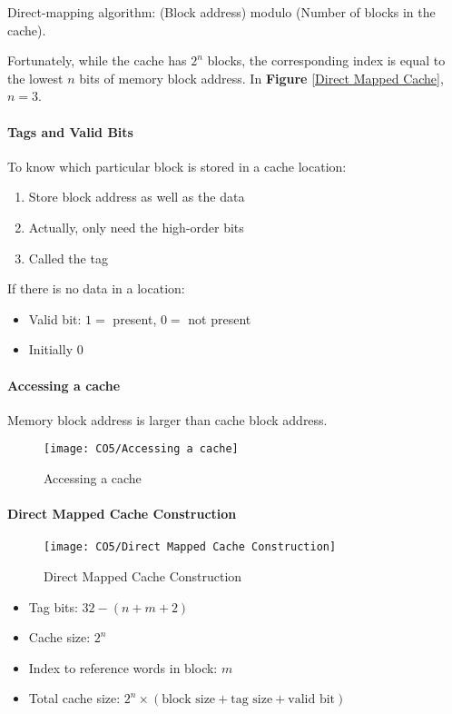 Direct-mapping algorithm: (Block address) modulo (Number of blocks in the cache). 

Fortunately, while the cache has $2^n$ blocks, the corresponding index is equal to the lowest $n$ bits of memory block address. In \textbf{Figure} \ref{Direct Mapped Cache}, $n=3$.

\paragraph{Tags and Valid Bits}
To know which particular block is stored in a cache location: 
\begin{enumerate}\small
    \item Store block address as well as the data
    \item Actually, only need the high-order bits
    \item Called the tag
\end{enumerate}

If there is no data in a location:
\begin{itemize}\small
    \item Valid bit: $1 =$ present, $0 =$ not present
    \item Initially 0
\end{itemize}

\paragraph{Accessing a cache}
Memory block address is larger than cache block address. 

\begin{figure}[!htb]
    \centering
    \texttt{[image: CO5/Accessing a cache]}
    \caption{Accessing a cache}
\end{figure}

\paragraph{Direct Mapped Cache Construction}

\begin{figure}[!htb]
    \centering
    \texttt{[image: CO5/Direct Mapped Cache Construction]}
    \caption{Direct Mapped Cache Construction}
\end{figure}


\begin{itemize}\small
    \item Tag bits: $32-(n+m+2)$
    \item Cache size: $2^n$
    \item Index to reference words in block: $m$
    \item Total cache size: $2^n \times (\text{block size}+\text{tag size}+\text{valid bit})$
\end{itemize}

